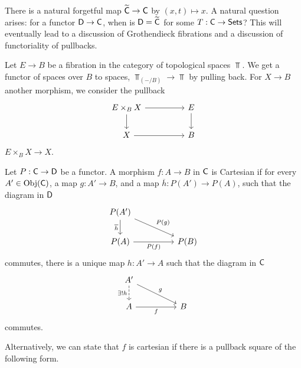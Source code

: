 There is a natural forgetful map $\widetilde{\mathsf{C}}\to\mathsf{C}$ by $(x,t)\mapsto x$. A natural question arises: for a functor $\mathsf{D}\to\mathsf{C}$, when is $\mathsf{D}=\widetilde{\mathsf{C}}$ for some $T:\mathsf{C}\to\mathsf{Sets}$? This will eventually lead to a discussion of Grothendieck fibrations and a discussion of functoriality of pullbacks. 
\begin{example}
    Let $E\to B$ be a fibration in the category of topological spaces $\Top$. We get a functor of spaces over $B$ to spaces, $\Top_{(-/B)}\to\Top$ by pulling back. For $X\to B$ another morphism, we consider the pullback 
    $$%
    \begin{tikzcd}
        {E\times_{B}X} && E \\
        X && B
        \arrow[from=1-1, to=1-3]
        \arrow[from=1-3, to=2-3]
        \arrow[from=2-1, to=2-3]
        \arrow[from=1-1, to=2-1]
    \end{tikzcd}$$
    $E\times_{B}X\to X$. 
\end{example}
\begin{definition}\label{def: Cartesian Fibration}
	Let $P:\mathsf{C}\to\mathsf{D}$ be a functor. A morphism $f:A\to B$ in $\mathsf{C}$ is Cartesian if for every $A'\in\mathrm{Obj}(\mathsf{C})$, a map $g:A'\to B$, and a map $\overline{h}:P(A')\to P(A)$, such that the diagram in $\mathsf{D}$
	$$%
	\begin{tikzcd}
		{P(A')} \\
		{P(A)} && {P(B)}
		\arrow["{\overline{h}}"', from=1-1, to=2-1]
		\arrow["{P(f)}"', from=2-1, to=2-3]
		\arrow["{P(g)}", from=1-1, to=2-3]
	\end{tikzcd}$$
	commutes, there is a unique map $h:A'\to A$ such that the diagram in $\mathsf{C}$
	$$%
	\begin{tikzcd}
		{A'} \\
		A && B
		\arrow["g", from=1-1, to=2-3]
		\arrow["f"', from=2-1, to=2-3]
		\arrow["{\exists! h}"', dashed, from=1-1, to=2-1]
	\end{tikzcd}$$
	commutes. 
\end{definition}
Alternatively, we can state that $f$ is cartesian if there is a pullback square of the following form. 
